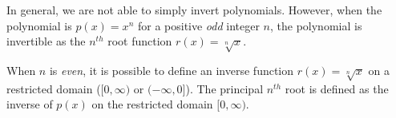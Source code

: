 \documentclass{ximera}
\begin{document}
%
%

\begin{summary}
In general, we are not able to simply invert polynomials.
However, when the polynomial is $p(x) = x^n$ for a positive {\em odd} integer $n$, the polynomial is invertible as the $n^{th}$ root function $r(x) = \sqrt[n]{x}$.

When $n$ is {\em even}, it is possible to define an inverse function $r(x) = \sqrt[n]{x}$ on a restricted domain ($[0, \infty)$ or $(-\infty,0]$). The principal $n^{th}$ root is defined as the inverse of $p(x)$ on the restricted domain $[0,\infty)$.
\end{summary}
\end{document}
